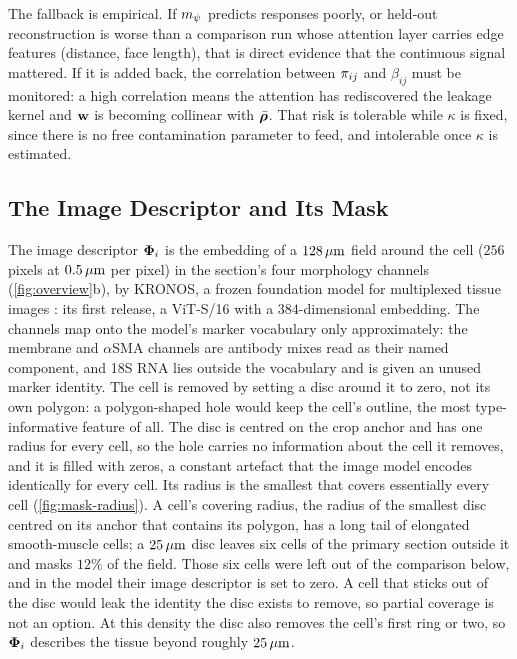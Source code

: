  The fallback is empirical. If $m_{\psi}$ predicts responses poorly, or held-out reconstruction is worse than a comparison run whose attention layer carries edge features (distance, face length), that is direct evidence that the continuous signal mattered. If it is added back, the correlation between $\pi_{ij}$ and $\beta_{ij}$ must be monitored: a high correlation means the attention has rediscovered the leakage kernel and $\mathbf{w}$ is becoming collinear with $\bar{\boldsymbol{\rho}}$. That risk is tolerable while $\kappa$ is fixed, since there is no free contamination parameter to feed, and intolerable once $\kappa$ is estimated. 

\subsection{The Image Descriptor and Its Mask}
\label{app:image}

 The image descriptor $\boldsymbol{\Phi}_i$ is the embedding of a $128\,\mu\text{m}$ field around the cell ($256$ pixels at $0.5\,\mu\text{m}$ per pixel) in the section's four morphology channels (\cref{fig:overview}b), by KRONOS, a frozen foundation model for multiplexed tissue images \citep{kronos2025}: its first release, a ViT-S/16 with a $384$-dimensional embedding. The channels map onto the model's marker vocabulary only approximately: the membrane and $\alpha$SMA channels are antibody mixes read as their named component, and 18S RNA lies outside the vocabulary and is given an unused marker identity. The cell is removed by setting a disc around it to zero, not its own polygon: a polygon-shaped hole would keep the cell's outline, the most type-informative feature of all. The disc is centred on the crop anchor and has one radius for every cell, so the hole carries no information about the cell it removes, and it is filled with zeros, a constant artefact that the image model encodes identically for every cell. Its radius is the smallest that covers essentially every cell (\cref{fig:mask-radius}). A cell's covering radius, the radius of the smallest disc centred on its anchor that contains its polygon, has a long tail of elongated smooth-muscle cells; a $25\,\mu\text{m}$ disc leaves six cells of the primary section outside it and masks $12\%$ of the field. Those six cells were left out of the comparison below, and in the model their image descriptor is set to zero. A cell that sticks out of the disc would leak the identity the disc exists to remove, so partial coverage is not an option. At this density the disc also removes the cell's first ring or two, so $\boldsymbol{\Phi}_i$ describes the tissue beyond roughly $25\,\mu\text{m}$.

